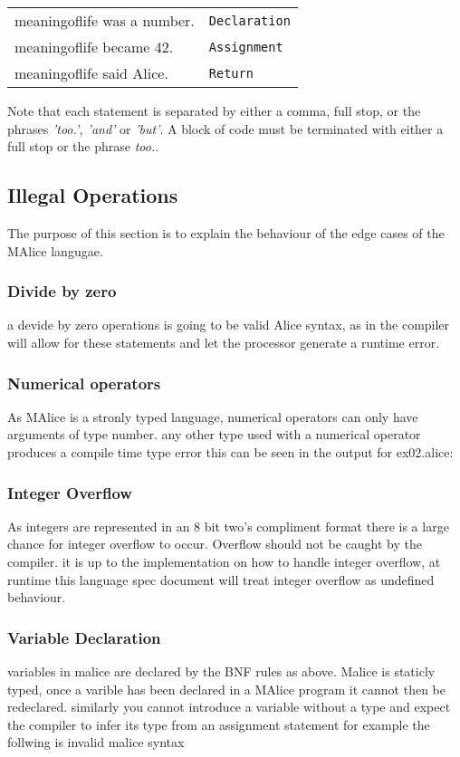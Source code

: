 \documentclass[a4wide, 10pt]{article}
\newcommand{\tab}{\hspace*{2em}}
\begin{document}
\begin{table}[h]
\begin{tabular}{l l}
\tab meaningoflife was a number. & \verb|Declaration| \\
\tab meaningoflife became 42. & \verb|Assignment| \\
\tab meaningoflife said Alice. & \verb|Return| \\
\end{tabular}
\end{table}
  
Note that each statement is separated by either a comma, full stop, or the 
phrases \emph{'too.', 'and'} or \emph{'but'}. A block of code must be 
terminated with either a full stop or the phrase \emph{too.}.

\subsection{Illegal Operations}
The purpose of this section is to explain the behaviour of the edge cases of the
MAlice langugae.

\subsubsection{Divide by zero}
a devide by zero operations is going to be valid Alice syntax, as in the compiler
will allow for these statements and let the processor generate a runtime error.


\subsubsection{Numerical operators}
As MAlice is a stronly typed language, numerical operators can only have 
arguments of type number. any other type used with a numerical operator produces
a compile time type error this can be seen in the output for ex02.alice:


\subsubsection{Integer Overflow}
As integers are represented in an 8 bit two's compliment format there is a 
large chance for integer overflow to occur. Overflow should not be caught by the
compiler. it is up to the implementation on how to handle integer overflow, at 
runtime this language spec document will treat integer overflow as undefined 
behaviour.


\subsubsection{Variable Declaration}
variables in malice are declared by the BNF rules as above.
Malice is staticly typed, once a varible has been declared in a MAlice program 
it cannot then be redeclared. similarly you cannot introduce a variable without 
a type and expect the compiler to infer its type from an assignment statement for
example the follwing is invalid malice syntax
\end{document}
